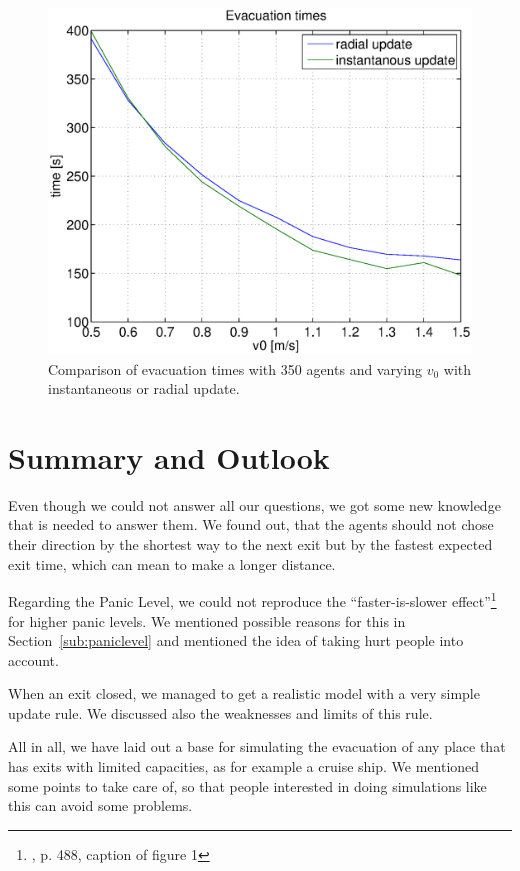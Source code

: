 \documentclass[11pt]{article}
\begin{document}
\begin{figure}[h]
	\centering
	\includegraphics[scale=0.5]{images/evactimescomparefew.eps}
	\caption{Comparison of evacuation times with 350 agents and varying \(v_0\) with instantaneous or radial update. 	}
	\label{evactimescomparefew}
\end{figure}

\FloatBarrier %

\section{Summary and Outlook}

Even though we could not answer all our questions, we got some new
knowledge that is needed to answer them. We found out, that the agents
should not chose their direction by the shortest way to the next exit but by 
the fastest expected exit time, which can mean to make a longer distance.

Regarding the Panic Level, we could not reproduce the ``faster-is-slower effect''\footnote{\cite{helbing}, p. 488, caption of figure 1}
for higher panic levels. We mentioned possible reasons for this in Section~\ref{sub:paniclevel} and mentioned 
the idea of taking hurt people into account.

When an exit closed, we managed to get a realistic model with a very simple update rule. 
We discussed also the weaknesses and limits of this rule.

All in all, we have laid out a base for simulating the evacuation of any place that has exits with limited capacities, as for example a cruise ship.
We mentioned some points to take care of, so that people interested in doing simulations like this can avoid some problems.
\end{document}
